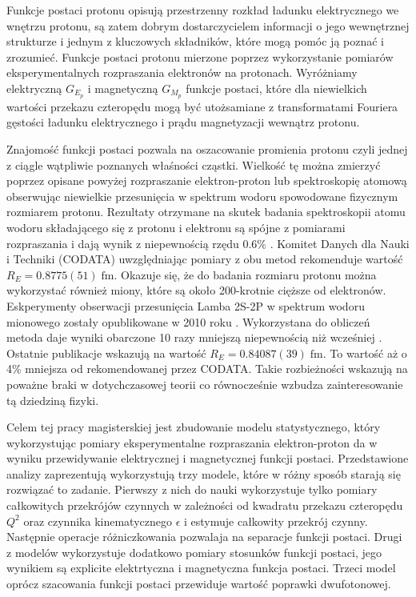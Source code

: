 \documentclass[11pt]{book}
\theoremstyle{definition}
\begin{document}
Funkcje postaci protonu opisują przestrzenny rozkład ładunku elektrycznego we wnętrzu protonu, są zatem dobrym dostarczycielem informacji o jego wewnętrznej strukturze i jednym z kluczowych składników, które mogą pomóc ją poznać i zrozumieć. Funkcje postaci protonu mierzone poprzez wykorzystanie pomiarów eksperymentalnych rozpraszania elektronów na protonach. Wyróżniamy elektryczną $G_{E_p}$ i magnetyczną $G_{M_p}$ funkcje postaci, które dla niewielkich wartości przekazu czteropędu mogą być utożsamiane z transformatami Fouriera gęstości ładunku elektrycznego i prądu magnetyzacji wewnątrz protonu. 

Znajomość funkcji postaci pozwala na oszacowanie promienia protonu czyli jednej z ciągle wątpliwie poznanych właśności cząstki. Wielkość tę można zmierzyć poprzez opisane powyżej rozpraszanie elektron-proton lub spektroskopię atomową obserwując niewielkie przesunięcia w spektrum wodoru spowodowane fizycznym rozmiarem protonu. Rezultaty otrzymane na skutek badania spektroskopii atomu wodoru składającego się z protonu i elektronu są spójne z pomiarami rozpraszania i dają wynik z niepewnością rzędu 0.6\% \cite{Carlson:2015jba}. Komitet Danych dla Nauki i Techniki (CODATA) uwzględniając pomiary z obu metod rekomenduje wartość \cite{2012RvMP...84.1527M}
$R_E = 0.8775(51) \; \text{fm}$. Okazuje się, że do badania rozmiaru protonu można wykorzystać również miony, które są około 200-krotnie cięższe od elektronów. Eskperymenty obserwacji przesunięcia Lamba 2S-2P w spektrum wodoru mionowego zostały opublikowane w 2010 roku \cite{2010Nature..Pohl}. Wykorzystana do obliczeń metoda daje wyniki obarczone 10 razy mniejszą niepewnością niż wcześniej \cite{Carlson:2015jba}. Ostatnie publikacje  \cite{Antognini417} wskazują na wartość $R_E = 0.84087(39) \; \text{fm}.$ To wartość aż o 4\% mniejsza od rekomendowanej przez CODATA. Takie rozbieżności wskazują na poważne braki w dotychczasowej teorii co równocześnie wzbudza zainteresowanie tą dziedziną fizyki.

Celem tej pracy magisterskiej jest zbudowanie modelu statystycznego, który wykorzystując pomiary eksperymentalne rozpraszania elektron-proton da w wyniku przewidywanie elektrycznej i magnetycznej funkcji postaci. Przedstawione analizy zaprezentują wykorzystują trzy modele, które w różny sposób starają się rozwiązać to zadanie. Pierwszy z nich do nauki wykorzystuje tylko pomiary całkowitych przekrójów czynnych w zależności od kwadratu przekazu czteropędu $Q^2$ oraz czynnika kinematycznego $\epsilon$ i estymuje całkowity przekrój czynny. Następnie operacje różniczkowania pozwalaja na separacje funkcji postaci. Drugi z modelów wykorzystuje dodatkowo pomiary stosunków funkcji postaci, jego wynikiem są explicite elektrtyczna i magnetyczna funkcja postaci. Trzeci model oprócz szacowania funkcji postaci przewiduje wartość poprawki dwufotonowej.
\end{document}

